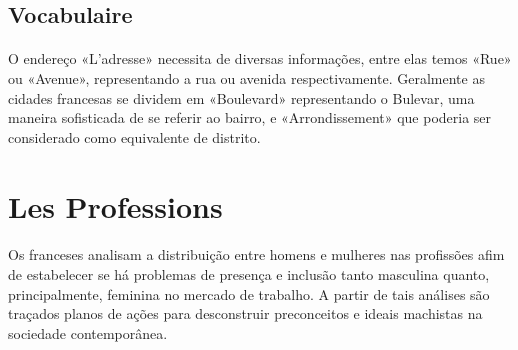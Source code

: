 \documentclass{article}
\begin{document}
    \subsection{Vocabulaire}
        \paragraph{}O endereço «L'adresse» necessita de diversas informações, entre elas temos «Rue» ou «Avenue», representando a rua ou avenida respectivamente. Geralmente as cidades francesas se dividem em «Boulevard» representando o Bulevar, uma maneira sofisticada de se referir ao bairro, e «Arrondissement» que poderia ser considerado como equivalente de distrito.
\newpage

\section{Les Professions}
    \paragraph{}Os franceses analisam a distribuição entre homens e mulheres nas profissões afim de estabelecer se há problemas de presença e inclusão tanto masculina quanto, principalmente, feminina no mercado de trabalho. A partir de tais análises são traçados planos de ações para desconstruir preconceitos e ideais machistas na sociedade contemporânea.
    
\end{document}
